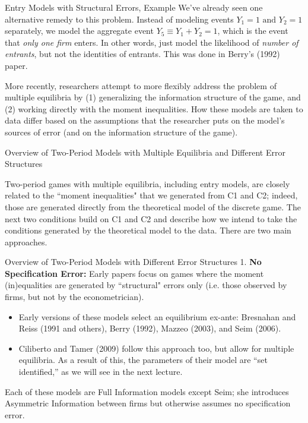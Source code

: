\begin{frame}{Entry Models with Structural Errors, Example}
We've already seen one alternative remedy to this problem. Instead of modeling events $Y_1 = 1 \text{ and } Y_2 = 1$ separately, we model the aggregate event $Y_5 \equiv Y_1 + Y_2 = 1$, which is the event that \emph{only one firm} enters. In other words, just model the likelihood of \emph{number of entrants}, but not the identities of entrants. This was done in Berry's (1992) paper. 

\vspace{0.2in}
More recently, researchers attempt to more flexibly address the problem of multiple equilibria by (1) generalizing the information structure of the game, and (2) working directly with the moment inequalities.  How these models are taken to data differ based on the assumptions that the researcher puts on the model's sources of error (and on the information structure of the game).

\end{frame}


\begin{frame}{Overview of Two-Period Models with Multiple Equilibria and Different Error Structures}

Two-period games with multiple equilibria, including entry models, are closely related to the ``moment inequalities" that we generated from C1 and C2; indeed, those are generated directly from the theoretical model of the discrete game.  The next two conditions build on C1 and C2 and describe how we intend to take the conditions generated by the theoretical model to the data.  There are two main approaches.\\

\end{frame}


\begin{frame}{Overview of Two-Period Models with Different Error Structures}
\vspace{2mm}
1. {\bf No Specification Error:} Early papers focus on games where the moment (in)equalities are generated by ``structural" errors only (i.e. those observed by firms, but not by the econometrician).  
\begin{itemize}
\item Early versions of these models select an equilibrium ex-ante: Bresnahan and Reiss (1991 and others), Berry (1992), Mazzeo (2003), and Seim (2006).  
\item Ciliberto and Tamer (2009) follow this approach too, but allow for multiple equilibria.  As a result of this, the parameters of their model are ``set identified,'' as we will see in the next lecture.
\end{itemize}
Each of these models are Full Information models except Seim; she introduces Asymmetric Information between firms but otherwise assumes no specification error.\\
\end{frame}


